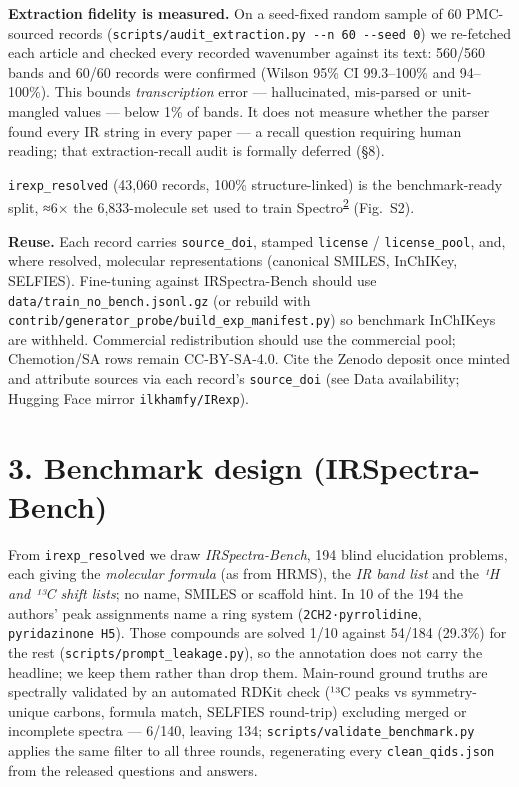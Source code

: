 \documentclass[
  10pt,
]{article}
\begin{document}
\textbf{Extraction fidelity is measured.} On a seed-fixed random sample
of 60 PMC-sourced records
(\texttt{scripts/\hspace{0pt}audit\_extraction.py\ -\/-n\ 60\ -\/-seed\ 0})
we re-fetched each article and checked every recorded wavenumber against
its text: 560/560 bands and 60/60 records were confirmed (Wilson 95\% CI
99.3--100\% and 94--100\%). This bounds \emph{transcription} error ---
hallucinated, mis-parsed or unit-mangled values --- below 1\% of bands.
It does not measure whether the parser found every IR string in every
paper --- a recall question requiring human reading; that
extraction-recall audit is formally deferred (§8).

\texttt{irexp\_resolved} (43,060 records, 100\% structure-linked) is the
benchmark-ready split, ≈6× the 6,833-molecule set used to train
Spectro\textsuperscript{\protect\hyperlink{ref-chacko2024spectro}{2}}
(Fig.~S2).

\textbf{Reuse.} Each record carries \texttt{source\_doi}, stamped
\texttt{license} / \texttt{license\_pool}, and, where resolved,
molecular representations (canonical SMILES, InChIKey, SELFIES).
Fine-tuning against IRSpectra-Bench should use
\texttt{data/\hspace{0pt}train\_no\_bench.jsonl.gz} (or rebuild with
\texttt{contrib/\hspace{0pt}generator\_probe/\hspace{0pt}build\_exp\_manifest.py})
so benchmark InChIKeys are withheld. Commercial redistribution should
use the commercial pool; Chemotion/SA rows remain CC-BY-SA-4.0. Cite the
Zenodo deposit once minted and attribute sources via each record's
\texttt{source\_doi} (see Data availability; Hugging Face mirror
\texttt{ilkhamfy/\hspace{0pt}IRexp}).

\hypertarget{benchmark-design-irspectra-bench}{%
\section{3. Benchmark design
(IRSpectra-Bench)}\label{benchmark-design-irspectra-bench}}

From \texttt{irexp\_resolved} we draw \emph{IRSpectra-Bench}, 194 blind
elucidation problems, each giving the \emph{molecular formula} (as from
HRMS), the \emph{IR band list} and the \emph{¹H and ¹³C shift lists}; no
name, SMILES or scaffold hint. In 10 of the 194 the authors' peak
assignments name a ring system (\texttt{2CH2·pyrrolidine},
\texttt{pyridazinone\ H5}). Those compounds are solved 1/10 against
54/184 (29.3\%) for the rest
(\texttt{scripts/\hspace{0pt}prompt\_leakage.py}), so the annotation
does not carry the headline; we keep them rather than drop them.
Main-round ground truths are spectrally validated by an automated RDKit
check (¹³C peaks vs symmetry-unique carbons, formula match, SELFIES
round-trip) excluding merged or incomplete spectra --- 6/140, leaving
134; \texttt{scripts/\hspace{0pt}validate\_benchmark.py} applies the
same filter to all three rounds, regenerating every
\texttt{clean\_qids.json} from the released questions and answers.
\end{document}
